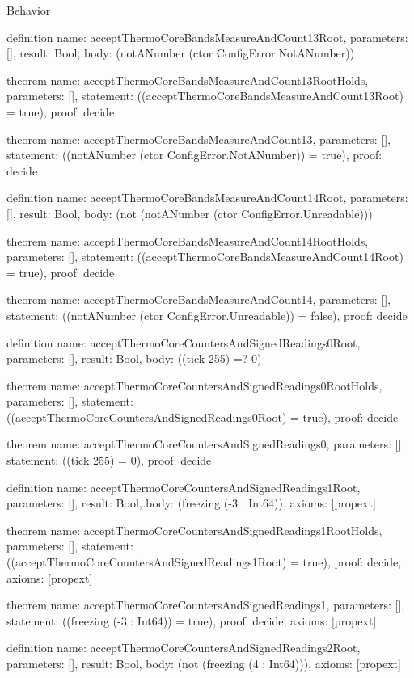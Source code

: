\begin{lexlean}{Behavior}
\begin{semanticmodule}
definition{
  name: acceptThermoCoreBandsMeasureAndCount13Root,
  parameters: [],
  result: Bool,
  body: (notANumber (ctor ConfigError.NotANumber))
}

theorem{
  name: acceptThermoCoreBandsMeasureAndCount13RootHolds,
  parameters: [],
  statement: ((acceptThermoCoreBandsMeasureAndCount13Root) = true),
  proof: decide{}
}

theorem{
  name: acceptThermoCoreBandsMeasureAndCount13,
  parameters: [],
  statement: ((notANumber (ctor ConfigError.NotANumber)) = true),
  proof: decide{}
}

definition{
  name: acceptThermoCoreBandsMeasureAndCount14Root,
  parameters: [],
  result: Bool,
  body: (not (notANumber (ctor ConfigError.Unreadable)))
}

theorem{
  name: acceptThermoCoreBandsMeasureAndCount14RootHolds,
  parameters: [],
  statement: ((acceptThermoCoreBandsMeasureAndCount14Root) = true),
  proof: decide{}
}

theorem{
  name: acceptThermoCoreBandsMeasureAndCount14,
  parameters: [],
  statement: ((notANumber (ctor ConfigError.Unreadable)) = false),
  proof: decide{}
}

definition{
  name: acceptThermoCoreCountersAndSignedReadings0Root,
  parameters: [],
  result: Bool,
  body: ((tick 255) =? 0)
}

theorem{
  name: acceptThermoCoreCountersAndSignedReadings0RootHolds,
  parameters: [],
  statement: ((acceptThermoCoreCountersAndSignedReadings0Root) = true),
  proof: decide{}
}

theorem{
  name: acceptThermoCoreCountersAndSignedReadings0,
  parameters: [],
  statement: ((tick 255) = 0),
  proof: decide{}
}

definition{
  name: acceptThermoCoreCountersAndSignedReadings1Root,
  parameters: [],
  result: Bool,
  body: (freezing (-3 : Int64)),
  axioms: [propext]
}

theorem{
  name: acceptThermoCoreCountersAndSignedReadings1RootHolds,
  parameters: [],
  statement: ((acceptThermoCoreCountersAndSignedReadings1Root) = true),
  proof: decide{},
  axioms: [propext]
}

theorem{
  name: acceptThermoCoreCountersAndSignedReadings1,
  parameters: [],
  statement: ((freezing (-3 : Int64)) = true),
  proof: decide{},
  axioms: [propext]
}

definition{
  name: acceptThermoCoreCountersAndSignedReadings2Root,
  parameters: [],
  result: Bool,
  body: (not (freezing (4 : Int64))),
  axioms: [propext]
}


\end{semanticmodule}
\end{lexlean}
